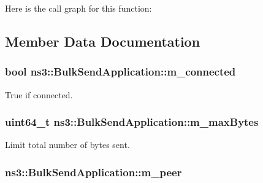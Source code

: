 Here is the call graph for this function\+:




\subsection{Member Data Documentation}
\subsubsection[{\texorpdfstring{m\+\_\+connected}{m_connected}}]{\setlength{\rightskip}{0pt plus 5cm}bool ns3\+::\+Bulk\+Send\+Application\+::m\+\_\+connected\hspace{0.3cm}{\ttfamily [private]}}\hypertarget{classns3_1_1BulkSendApplication_a85426b1c45ff85e687c101ff2c40a598}{}\label{classns3_1_1BulkSendApplication_a85426b1c45ff85e687c101ff2c40a598}


True if connected. 

\subsubsection[{\texorpdfstring{m\+\_\+max\+Bytes}{m_maxBytes}}]{\setlength{\rightskip}{0pt plus 5cm}uint64\+\_\+t ns3\+::\+Bulk\+Send\+Application\+::m\+\_\+max\+Bytes\hspace{0.3cm}{\ttfamily [private]}}\hypertarget{classns3_1_1BulkSendApplication_aaada1266be784683ddfa76dc71efbc06}{}\label{classns3_1_1BulkSendApplication_aaada1266be784683ddfa76dc71efbc06}


Limit total number of bytes sent. 

\subsubsection[{\texorpdfstring{m\+\_\+peer}{m_peer}}]{ ns3\+::\+Bulk\+Send\+Application\+::m\+\_\+peer\hspace{0.3cm}{\ttfamily [private]}}\hypertarget{classns3_1_1BulkSendApplication_a0f4c02d4849b50e26ba6f5cbc90d56c4}{}\label{classns3_1_1BulkSendApplication_a0f4c02d4849b50e26ba6f5cbc90d56c4}


